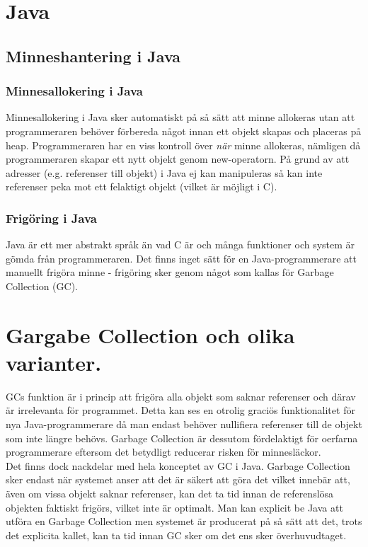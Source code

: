 \documentclass[12pt,a4paper]{article}
\begin{document}
\section{Java}
\subsection{Minneshantering i Java}
\subsubsection{Minnesallokering i Java}
Minnesallokering i Java sker automatiskt på så sätt att minne allokeras utan att programmeraren behöver förbereda något innan ett 
objekt skapas och placeras på heap. Programmeraren har en viss kontroll över \textit{när} minne allokeras, nämligen då programmeraren skapar ett nytt objekt genom new-operatorn. På grund av att adresser (e.g. referenser till objekt) i Java ej kan manipuleras så kan inte referenser peka mot ett felaktigt objekt (vilket är möjligt i C).
\subsubsection{Frigöring i Java}
Java är ett mer abstrakt språk än vad C är och många funktioner och system är gömda från programmeraren. Det finns inget sätt för en Java-programmerare att manuellt frigöra minne - frigöring sker genom något som kallas för Garbage Collection (GC). 
\section{Gargabe Collection och olika varianter.}
GCs funktion är i princip att frigöra alla objekt som saknar referenser och därav är irrelevanta för programmet.
Detta kan ses en otrolig graciös funktionalitet för nya Java-programmerare då man endast behöver nullifiera 
referenser till de objekt som inte längre behövs. Garbage Collection är dessutom fördelaktigt för oerfarna programmerare eftersom det betydligt reducerar risken för minnesläckor.
\\

Det finns dock nackdelar med hela konceptet av GC i Java. Garbage Collection sker endast när systemet anser att det är säkert att göra det vilket innebär att, även om vissa objekt saknar referenser, kan det ta tid innan de referenslösa objekten faktiskt frigörs, vilket inte är optimalt. Man kan explicit be Java att 
utföra en Garbage Collection men systemet är producerat på så sätt att det, trots det explicita kallet, kan ta tid innan GC sker om det ens sker överhuvudtaget. 
\end{document}
